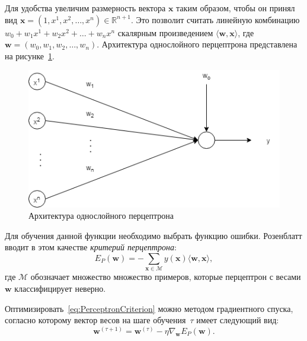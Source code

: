Для удобства увеличим размерность вектора $ \boldsymbol{x} $ таким образом, чтобы он принял вид $ \boldsymbol{x} = (1, x^1, x^2, \ldots, x^n) \in \mathbb{R}^{n + 1} $. Это позволит считать линейную комбинацию $ w_0 + w_1x^1 + w_2x^2 + \ldots + w_nx^n $ скалярным произведением $ \langle \boldsymbol{w}, \boldsymbol{x} \rangle $, где $ \boldsymbol{w} = (w_0, w_1, w_2, \ldots, w_n) $. Архитектура однослойного перцептрона представлена на рисунке~\ref{fig:OneLayerPerceptron}.

\begin{figure}[h]
\centering
\includegraphics[width=1\textwidth]{include/graphics/one-layer_perceptron}
\caption{Архитектура однослойного перцептрона}
\label{fig:OneLayerPerceptron}
\end{figure}

Для обучения данной функции необходимо выбрать функцию ошибки. Розенблатт вводит в этом качестве \textit{критерий перцептрона}:
\begin{equation}
E_P(\boldsymbol{w}) = - \sum_{\boldsymbol{x} \in \mathcal{M}} y(\boldsymbol{x}) \langle \boldsymbol{w}, \boldsymbol{x} \rangle,
\label{eq:PerceptronCriterion}
\end{equation}
где $ \mathcal{M} $ обозначает множество множество примеров, которые перцептрон с весами $ \mathbf{w} $ классифицирует неверно.

Оптимизировать~\ref{eq:PerceptronCriterion} можно методом градиентного спуска, согласно которому вектор весов на шаге обучения~$ \tau $ имеет следующий вид:
\begin{equation*}
\boldsymbol{w}^{(\tau + 1)} = \boldsymbol{w}^{(\tau)} - \eta\nabla_{\boldsymbol{w}}E_P(\boldsymbol{w}).
\end{equation*}

